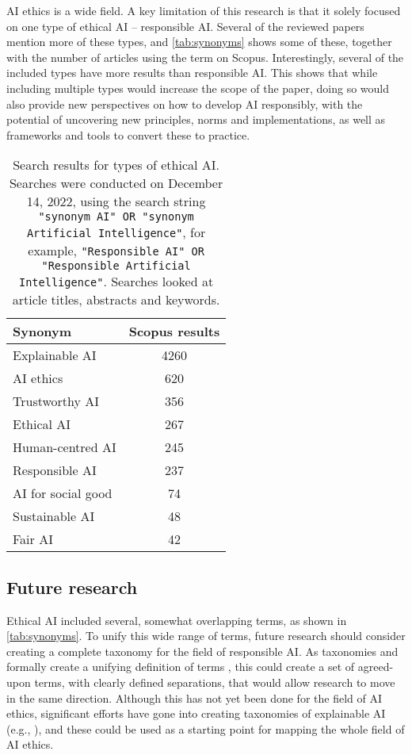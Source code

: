 AI ethics is a wide field. A key limitation of this research is that it solely focused on one type of ethical AI -- responsible AI. Several of the reviewed papers mention more of these types, and \autoref{tab:synonyms} shows some of these, together with the number of articles using the term on Scopus. Interestingly, several of the included types have more results than responsible AI. This shows that while including multiple types would increase the scope of the paper, doing so would also provide new perspectives on how to develop AI responsibly, with the potential of uncovering new principles, norms and implementations, as well as frameworks and tools to convert these to practice.

\begin{table}[ht]
    \centering
    \caption[Search results for types of ethical AI]{Search results for types of ethical AI. Searches were conducted on December 14, 2022, using the search string \texttt{"synonym AI" OR "synonym Artificial Intelligence"}, for example, \texttt{"Responsible AI" OR "Responsible Artificial Intelligence"}. Searches looked at article titles, abstracts and keywords.}
    \label{tab:synonyms}
    \begin{tabular}{p{}c}
    \toprule
        \textbf{Synonym} & \textbf{Scopus results} \\
    \midrule
        Explainable AI & 4260 \\
        AI ethics & 620 \\
        Trustworthy AI & 356 \\
        Ethical AI & 267 \\
        Human-centred AI & 245 \\
        Responsible AI & 237 \\
        AI for social good & 74 \\
        Sustainable AI & 48 \\
        Fair AI & 42 \\
    \bottomrule
    \end{tabular}
\end{table}


\subsection{Future research}
Ethical AI included several, somewhat overlapping terms, as shown in \autoref{tab:synonyms}. To unify this wide range of terms, future research should consider creating a complete taxonomy for the field of responsible AI. As taxonomies  \parencite{Kundisch_2022} and formally create a unifying definition of terms \parencite{Uschold_1996}, this could create a set of agreed-upon terms, with clearly defined separations, that would allow research to move in the same direction. Although this has not yet been done for the field of AI ethics, significant efforts have gone into creating taxonomies of explainable AI (e.g., \cite{BarredoArrieta_2020,Clinciu_2019,Graziani_2022,Bellucci_2021,Brennen_2020}), and these could be used as a starting point for mapping the whole field of AI ethics.



